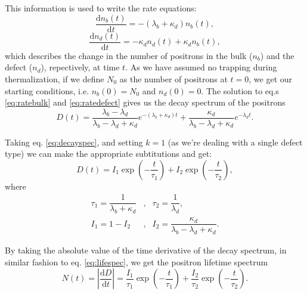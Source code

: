This information is used to write the rate equations:
\begin{equation}
    \frac{\mathrm{d}n_b(t)}{\mathrm{d}t} = -(\lambda_b + \kappa_d) n_b(t),
    \label{eq:ratebulk}
\end{equation}
\begin{equation}
    \frac{\mathrm{d}n_d(t)}{\mathrm{d}t} = - \kappa_d n_d(t) + \kappa_d n_b(t),
    \label{eq:ratedefect}
\end{equation}
which describes the change in the number of positrons in the bulk ($n_b$) and the defect ($n_d$), repectively, at time $t$. As we have assumed no trapping during thermalization, if we define $N_0$ as the number of positrons at $t=0$, we get our starting conditions, i.e. $n_b(0) = N_0$ and $n_d(0) = 0$. The solution to eq.s \ref{eq:ratebulk} and \ref{eq:ratedefect} gives us the decay spectrum of the positrons
\begin{equation}
    D(t) = \frac{\lambda_b - \lambda_d}{\lambda_b - \lambda_d + \kappa_d} e^{- (\lambda_b+\kappa_d) t} + 
    \frac{\kappa_d}{\lambda_b - \lambda_d + \kappa_d} e^{-\lambda_d t}.
\end{equation}

Taking eq. \ref{eq:decayspec}, and setting $k=1$ (as we're dealing with a single defect type) we can make the appropriate subtitutions and get:
\begin{equation}
    D(t) = I_1\exp\left(-\frac{t}{\tau_1}\right) + I_2 \exp \left(-\frac{t}{\tau_2}\right),
\end{equation}
where
\begin{equation}
    \begin{array}{lcl}
        \tau_1 = \dfrac{1}{\lambda_b+\kappa_d} &,& \tau_2 = \dfrac{1}{\lambda_d}, \\
        I_1 = 1 - I_2                          &,& I_2 = \dfrac{\kappa_d}{\lambda_b - \lambda_d + \kappa_d}.
    \end{array}
    \label{eq:tau1tau2}
\end{equation}

By taking the absolute value of the time derivative of the decay spectrum, in similar fashion to eq. \ref{eq:lifespec}, we get the positron lifetime spectrum
\begin{equation}
    N(t) = \left|\frac{\mathrm{d}D}{\mathrm{d}t}\right| = 
    \frac{I_1}{\tau_1} \exp \left(-\frac{t}{\tau_1}\right) +
    \frac{I_2}{\tau_2} \exp \left(-\frac{t}{\tau_2}\right).
    \label{eq:stmlifespec}
\end{equation}

